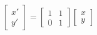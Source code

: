 \documentclass[preview]{standalone}
\begin{document}
\begin{align*}
\begin{bmatrix} x' \\ y' \end{bmatrix} = \begin{bmatrix} 1 & 1 \\ 0 & 1 \end{bmatrix} \begin{bmatrix} x \\ y \end{bmatrix}
\end{align*}
\end{document}
